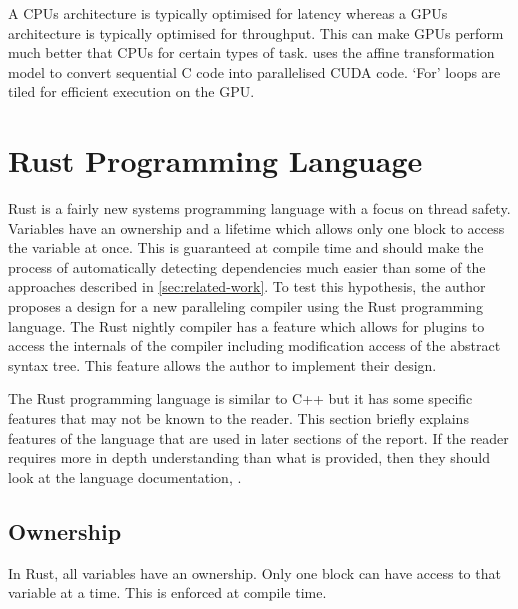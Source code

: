 \pagebreak %
A CPUs architecture is typically optimised for latency whereas a GPUs architecture is typically optimised for throughput. This can make GPUs perform much better that CPUs for certain types of task. \textcite{Baskaran2010} uses the affine transformation model to convert sequential C code into parallelised CUDA code. `For' loops are tiled for efficient execution on the GPU.

\section{Rust Programming Language}
\label{sec:rust-language-features}
Rust is a fairly new systems programming language with a focus on thread safety. Variables have an ownership and a lifetime which allows only one block to access the variable at once. This is guaranteed at compile time and should make the process of automatically detecting dependencies much easier than some of the approaches described in \autoref{sec:related-work}. To test this hypothesis, the author proposes a design for a new paralleling compiler using the Rust programming language. The Rust nightly compiler has a feature which allows for plugins to access the internals of the compiler including modification access of the abstract syntax tree. This feature allows the author to implement their design.

The Rust programming language is similar to C++ but it has some specific features that may not be known to the reader. This section briefly explains features of the language that are used in later sections of the report. If the reader requires more in depth understanding than what is provided, then they should look at the language documentation, \textcite{rustbook}.


\subsection{Ownership}
In Rust, all variables have an ownership. Only one block can have access to that variable at a time. This is enforced at compile time.

